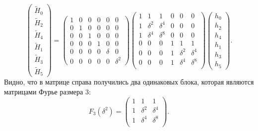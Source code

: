 \[
    \begin{pmatrix}
        \widetilde{H}_0 \\
        \widetilde{H}_2 \\
        \widetilde{H}_4 \\
        \widetilde{H}_1 \\
        \widetilde{H}_3 \\
        \widetilde{H}_5
    \end{pmatrix}
    =
    \begin{pmatrix}
        1 & 0 & 0 & 0 & 0      & 0        \\
        0 & 1 & 0 & 0 & 0      & 0        \\
        0 & 0 & 1 & 0 & 0      & 0        \\
        0 & 0 & 0 & 1 & 0      & 0        \\
        0 & 0 & 0 & 0 & \delta & 0        \\
        0 & 0 & 0 & 0 & 0      & \delta^2
    \end{pmatrix}
    \begin{pmatrix}
        1 & 1        & 1        & 0 & 0        & 0        \\
        1 & \delta^2 & \delta^4 & 0 & 0        & 0        \\
        1 & \delta^4 & \delta^8 & 0 & 0        & 0        \\
        0 & 0        & 0        & 1 & 1        & 1        \\
        0 & 0        & 0        & 1 & \delta^2 & \delta^4 \\
        0 & 0        & 0        & 1 & \delta^4 & \delta^8 \\
    \end{pmatrix}
    \begin{pmatrix}
        h_0 \\
        h_2 \\
        h_4 \\
        h_1 \\
        h_3 \\
        h_5
    \end{pmatrix} .
\]
Видно, что в матрице справа получились два одинаковых блока, которая являются матрицами Фурье размера 3:
\[
    F_3(\delta^2)
    = \begin{pmatrix}
          1 & 1        & 1        \\
          1 & \delta^2 & \delta^4 \\
          1 & \delta^4 & \delta^8 \\
    \end{pmatrix} .
\]
